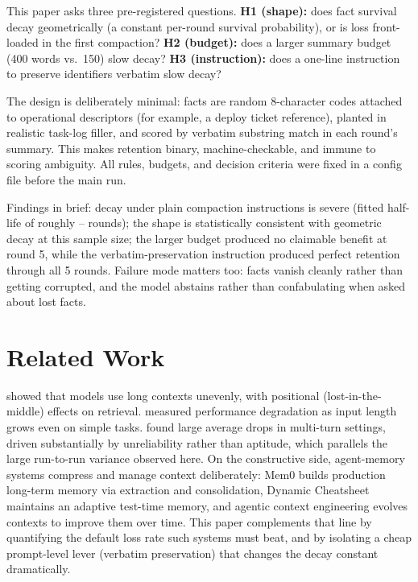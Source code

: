 \documentclass[11pt]{article}
\begin{document}
This paper asks three pre-registered questions. \textbf{H1 (shape):} does fact
survival decay geometrically (a constant per-round survival probability), or is
loss front-loaded in the first compaction? \textbf{H2 (budget):} does a larger
summary budget (400 words vs.\ 150) slow decay? \textbf{H3 (instruction):} does
a one-line instruction to preserve identifiers verbatim slow decay?

The design is deliberately minimal: facts are random 8-character codes attached
to operational descriptors (for example, a deploy ticket reference), planted in
realistic task-log filler, and scored by verbatim substring match in each
round's summary. This makes retention binary, machine-checkable, and immune to
scoring ambiguity. All rules, budgets, and decision criteria were fixed in a
config file before the main run.

Findings in brief: decay under plain compaction instructions is severe (fitted
half-life of roughly \ArmAHalfLife{}--\ArmBHalfLife{} rounds); the shape is
statistically consistent with geometric decay at this sample size; the larger
budget produced no claimable benefit at round 5, while the verbatim-preservation
instruction produced perfect retention through all 5 rounds. Failure mode
matters too: facts vanish cleanly rather than getting corrupted, and the model
abstains rather than confabulating when asked about lost facts.

\section{Related Work}

\citet{liu2024lost} showed that models use long contexts unevenly, with
positional (lost-in-the-middle) effects on retrieval. \citet{hong2025contextrot}
measured performance degradation as input length grows even on simple tasks.
\citet{laban2025lost} found large average drops in multi-turn settings, driven
substantially by unreliability rather than aptitude, which parallels the large
run-to-run variance observed here. On the constructive side, agent-memory
systems compress and manage context deliberately: Mem0 \cite{chhikara2025mem0}
builds production long-term memory via extraction and consolidation, Dynamic
Cheatsheet \cite{suzgun2025dynamic} maintains an adaptive test-time memory, and
agentic context engineering \cite{zhang2025agentic} evolves contexts to improve
them over time. This paper complements that line by quantifying the default
loss rate such systems must beat, and by isolating a cheap prompt-level lever
(verbatim preservation) that changes the decay constant dramatically.
\end{document}
